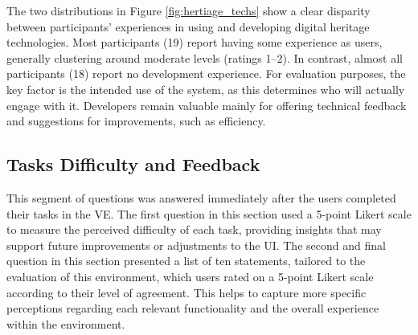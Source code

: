 The two distributions in Figure \ref{fig:hertiage_techs} show a clear disparity between participants' experiences in using and developing digital heritage technologies. Most participants (19) report having some experience as users, generally clustering around moderate levels (ratings 1–2). 
In contrast, almost all participants (18) report no development experience.
For evaluation purposes, the key factor is the intended use of the system, as this determines who will actually engage with it. Developers remain valuable mainly for offering technical feedback and suggestions for improvements, such as efficiency.







\subsection{Tasks Difficulty and Feedback}

This segment of questions was answered immediately after the users completed their tasks in the \gls{VE}.
The first question in this section used a 5-point Likert scale to measure the perceived difficulty of each task, providing insights that may support future improvements or adjustments to the \gls{UI}.
The second and final question in this section presented a list of ten statements, tailored to the evaluation of this environment, which users rated on a 5-point Likert scale according to their level of agreement.
This helps to capture more specific perceptions regarding each relevant functionality and the overall experience within the environment.


